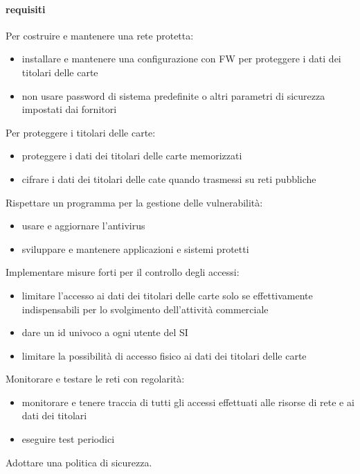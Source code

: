 \documentclass[11pt]{article}
\begin{document}
\paragraph*{requisiti}
Per costruire e mantenere una rete protetta:
\begin{itemize}
    \item installare e mantenere una configurazione con FW per proteggere i dati dei titolari delle carte 
    \item non usare password di sistema predefinite o altri parametri di sicurezza impostati dai fornitori 
\end{itemize}
Per proteggere i titolari delle carte:
\begin{itemize}
    \item proteggere i dati dei titolari delle carte memorizzati 
    \item cifrare i dati dei titolari delle cate quando trasmessi su reti pubbliche 
\end{itemize}
Rispettare un programma per la gestione delle vulnerabilità:
\begin{itemize}
    \item usare e aggiornare l'antivirus
    \item sviluppare e mantenere applicazioni e sistemi protetti 
\end{itemize}
Implementare misure forti per il controllo degli accessi:
\begin{itemize}
    \item limitare l'accesso ai dati dei titolari delle carte solo se effettivamente indispensabili per lo svolgimento 
    dell'attività commerciale 
    \item dare un id univoco a ogni utente del SI 
    \item limitare la possibilità di accesso fisico ai dati dei titolari delle carte 
\end{itemize}
Monitorare e testare le reti con regolarità:
\begin{itemize}
    \item monitorare e tenere traccia di tutti gli accessi effettuati alle risorse di rete e ai dati dei titolari 
    \item eseguire test periodici 
\end{itemize}
Adottare una politica di sicurezza.
\end{document}
